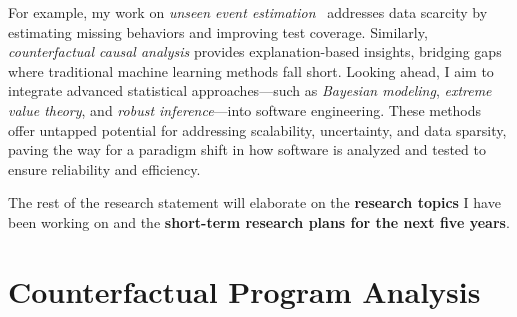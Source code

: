 \documentclass{article}
\begin{document}
For example, my work on \emph{unseen event estimation}~\cite{leeStatisticalReachabilityAnalysis2023,leeHowMuchUnseen2024,leeStructureawareResidualRisk2025,leeAccountingMissingEvents2025,liyanageExtrapolatingCoverageRate2024} addresses data scarcity by estimating missing behaviors and improving test coverage. Similarly, \emph{counterfactual causal analysis}\cite{leeObservationbasedApproximateDependency2021,leeCausalProgramDependence2025a,leeEvaluatingLexicalApproximation2020,ohEffectivelySamplingHigher2021} provides explanation-based insights, bridging gaps where traditional machine learning methods fall short.
% 
Looking ahead, I aim to integrate advanced statistical approaches—such as \emph{Bayesian modeling}, \emph{extreme value theory}, and \emph{robust inference}—into software engineering. These methods offer untapped potential for addressing scalability, uncertainty, and data sparsity, paving the way for a paradigm shift in how software is analyzed and tested to ensure reliability and efficiency.

\vspace{0.5em}

The rest of the research statement will elaborate on the \textbf{research topics} I have been working on and the \textbf{short-term research plans for the next five years}.


\newpage

\section{Counterfactual Program Analysis}
\label{sec:dependency}

\end{document}
